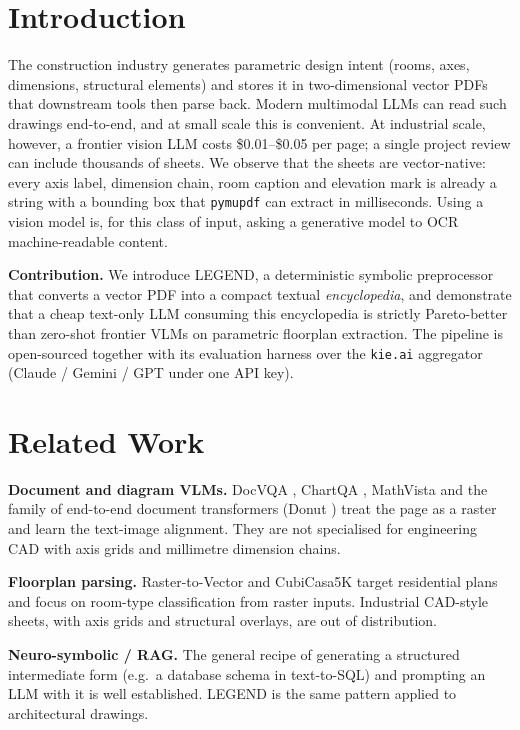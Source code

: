 \documentclass[conference]{IEEEtran}
\begin{document}
\section{Introduction}
The construction industry generates parametric design intent
(rooms, axes, dimensions, structural elements) and stores it in
two-dimensional vector PDFs that downstream tools then parse back.
Modern multimodal LLMs can read such drawings end-to-end, and at small scale
this is convenient. At industrial scale, however, a frontier vision LLM costs
\$0.01--\$0.05 per page; a single project review can include thousands of
sheets. We observe that the sheets are vector-native: every axis label,
dimension chain, room caption and elevation mark is already a string with a
bounding box that \texttt{pymupdf} can extract in milliseconds. Using a vision
model is, for this class of input, asking a generative model to OCR
machine-readable content.

\textbf{Contribution.} We introduce LEGEND, a deterministic symbolic
preprocessor that converts a vector PDF into a compact textual
\emph{encyclopedia}, and demonstrate that a cheap text-only LLM consuming
this encyclopedia is strictly Pareto-better than zero-shot frontier VLMs on
parametric floorplan extraction. The pipeline is open-sourced together with
its evaluation harness over the \texttt{kie.ai} aggregator
(Claude / Gemini / GPT under one API key).

\section{Related Work}
\textbf{Document and diagram VLMs.} DocVQA \cite{docvqa},
ChartQA \cite{chartqa}, MathVista \cite{mathvista} and the family of
end-to-end document transformers (Donut \cite{donut}) treat the page as a
raster and learn the text-image alignment. They are not specialised for
engineering CAD with axis grids and millimetre dimension chains.

\textbf{Floorplan parsing.} Raster-to-Vector \cite{r2v} and
CubiCasa5K \cite{cubicasa} target residential plans and focus on room-type
classification from raster inputs. Industrial CAD-style sheets, with axis
grids and structural overlays, are out of distribution.

\textbf{Neuro-symbolic / RAG.} The general recipe of generating a structured
intermediate form (e.g.\ a database schema in text-to-SQL) and prompting an
LLM with it is well established. LEGEND is the same pattern applied to
architectural drawings.
\end{document}
